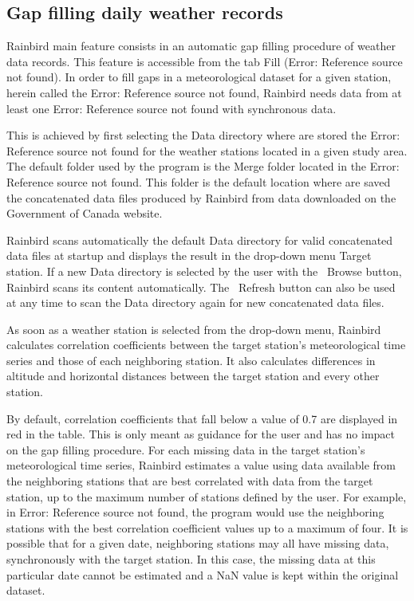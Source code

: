 \documentclass[12pt, letterpaper, fleqn]{report}
\begin{document}
\subsection{Gap filling daily weather records}

Rainbird main feature consists in an automatic gap filling procedure of weather data records. This feature is accessible from the tab Fill (Error: Reference source not found). In order to fill gaps in a meteorological dataset for a given station, herein called the Error: Reference source not found, Rainbird needs data from at least one Error: Reference source not found with synchronous data.

This is achieved by first selecting the Data directory where are stored the Error: Reference source not found for the weather stations located in a given study area. The default folder used by the program is the Merge folder located in the Error: Reference source not found. This folder is the default location where are saved the concatenated data files produced by Rainbird from data downloaded on the Government of Canada website.

Rainbird scans automatically the default Data directory for valid concatenated data files at startup and displays the result in the drop-down menu Target station. If a new Data directory is selected by the user with the  Browse button, Rainbird scans its content automatically. The  Refresh button can also be used at any time to scan the Data directory again for new concatenated data files.

As soon as a weather station is selected from the drop-down menu, Rainbird calculates correlation coefficients between the target station's meteorological time series and those of each neighboring station. It also calculates differences in altitude and horizontal distances between the target station and every other station.

By default, correlation coefficients that fall below a value of 0.7 are displayed in red in the table. This is only meant as guidance for the user and has no impact on the gap filling procedure. For each missing data in the target station's meteorological time series, Rainbird estimates a value using data available from the neighboring stations that are best correlated with data from the target station, up to the maximum number of stations defined by the user. For example, in Error: Reference source not found, the program would use the neighboring stations with the best correlation coefficient values up to a maximum of four. It is possible that for a given date, neighboring stations may all have missing data, synchronously with the target station. In this case, the missing data at this particular date cannot be estimated and a NaN value is kept within the original dataset.
\end{document}
